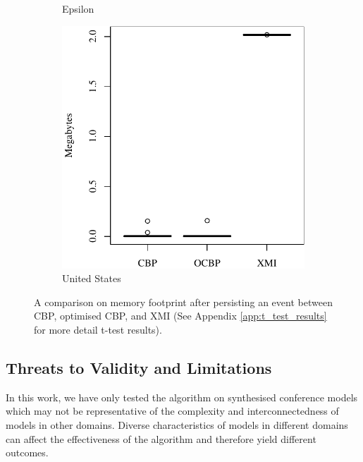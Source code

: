 \documentclass{llncs}
\begin{document}
\begin{figure}[t]
\begin{subfigure}{0.325\textwidth}
        \caption{Epsilon}
        \label{fig:save_memory_epsilon}
    \end{subfigure}
    \hfill
    \begin{subfigure}{0.325\textwidth}
        \centering
        \includegraphics[width=\linewidth]{images/save_memory_wikipedia}
        \caption{United States}
        \label{fig:save_memory_wikipedia}
    \end{subfigure}
    \caption{A comparison on memory footprint after persisting an event between CBP, optimised CBP, and XMI (See Appendix \ref{app:t_test_results} for more detail t-test results).}
    \label{fig:savememory}
\end{figure}



\subsection{Threats to Validity and Limitations}
\label{sec:limitations_and_future_work}
In this work, we have only tested the algorithm on synthesised conference models which may not be representative of the complexity and interconnectedness of models in other domains. Diverse characteristics of models in different domains can affect the effectiveness of the algorithm and therefore yield different outcomes. 
\end{document}
